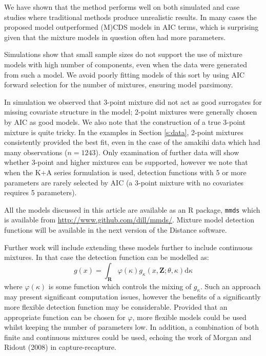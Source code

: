 \documentclass[useAMS,referee]{biom}
\begin{document}
We have shown that the method performs well on both simulated and case studies where traditional methods produce unrealistic results. In many cases the proposed model outperformed (M)CDS models in AIC terms, which is surprising given that the mixture models in question often had more parameters. 

Simulations show that small sample sizes do not support the use of mixture models with high number of components, even when the data were generated from such a model. We avoid poorly fitting models of this sort by using AIC forward selection for the number of mixtures, ensuring model parsimony.

In simulation we observed that 3-point mixture did not act as good surrogates for missing covariate structure in the model; 2-point mixtures were generally chosen by AIC as good models. We also note that the construction of a true 3-point mixture is quite tricky. In the examples in Section \ref{s:data}, 2-point mixtures consistently provided the best fit, even in the case of the amakihi data which had many observations ($n=1243$). Only examination of further data will show whether 3-point and higher mixtures can be supported, however we note that when the K$+$A series formulation is used, detection functions with 5 or more parameters are rarely selected by AIC (a 3-point mixture with no covariates requires 5 parameters).

All the models discussed in this article are available as an \textsf{R} package, \texttt{mmds} which is available from \url{http://www.github.com/dill/mmds/}. Mixture model detection functions will be available in the next version of the Distance software.

Further work will include extending these models further to include continuous mixtures. In that case the detection function can be modelled as:
\begin{equation*}
g(x) = \int_\mathbf{R} \varphi(\kappa) g_\kappa(x,\mathbf{Z}; \theta, \kappa) \text{d}\kappa
\end{equation*}
where $\varphi(\kappa)$ is some function which controls the mixing of $g_\kappa$. Such an approach may present significant computation issues, however the benefits of a significantly more flexible detection function may be considerable. Provided that an appropriate function can be chosen for $\varphi$, more flexible models could be used whilst keeping the number of parameters low. In addition, a combination of both finite and continuous mixtures could be used, echoing the work of Morgan and Ridout (2008) in capture-recapture.
\end{document}
